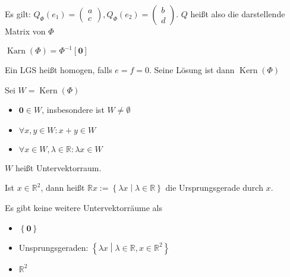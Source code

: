 \begin{remark}
  Es gilt: $Q_{\Phi}(e_1) =
  \begin{pmatrix}
    a\\c
  \end{pmatrix}
  , Q_{\Phi}(e_2) =
  \begin{pmatrix}
    b\\d
  \end{pmatrix}
  $.
  $Q$ heißt also die darstellende Matrix von $\Phi$
\end{remark}

\begin{definition}
  $\operatorname{Karn}(\Phi) = \Phi^{-1}[\mathbf{0}]$

  Ein LGS heißt homogen, falls $e = f = 0$. Seine Lösung ist dann $\operatorname{Kern}(\Phi)$
\end{definition}
\begin{proposition}
  Sei $W = \operatorname{Kern}(\Phi)$
  \begin{itemize}
  \item $\mathbf{0} \in W$, insbesondere ist $W \ne \emptyset$
  \item $\forall x, y \in W: x+y \in W$
  \item $\forall x \in W, \lambda \in \mathbb{R}: \lambda x \in W$
  \end{itemize}
  $W$ heißt Untervektorraum.
\end{proposition}
\begin{definition}[Ursprungsgerade]
  Ist $x \in \mathbb{R}^2$, dann heißt $\mathbb{R}x := \left\{ \lambda x \middle| \lambda \in \mathbb{R} \right\}$ die Ursprungsgerade durch $x$.
\end{definition}
\begin{theorem}
  Es gibt keine weitere Untervektorräume als
  \begin{itemize}
  \item $\left\{ \mathbf{0} \right\}$
  \item Unsprungsgeraden: $\left\{ \lambda x \middle| \lambda \in \mathbb{R}, x \in \mathbb{R}^2 \right\}$
  \item $\mathbb{R}^2$
  \end{itemize}
\end{theorem}